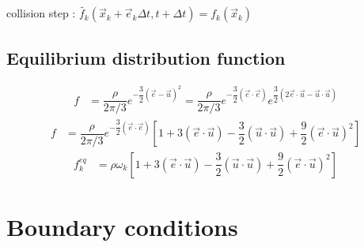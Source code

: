 \documentclass[12pt,a4paper]{report}
\begin{document}
	collision step : $\tilde{f_k}\left(\vec{x}_k + \vec{e}_k\Delta t, t+ \Delta t\right) = f_k(\vec{x}_k)$
	
	\subsection{Equilibrium distribution function}
		\begin{align}
			f &= \dfrac{\rho}{2\pi/3}e^{-\dfrac{3}{2}(\vec{e}-\vec{u})^2} = \dfrac{\rho}{2\pi/3}e^{-\dfrac{3}{2}(\vec{e}\cdot\vec{e})}e^{\dfrac{3}{2}(2\vec{e}\cdot\vec{u} - \vec{u}\cdot\vec{u})}
		\end{align}
		\begin{align}
			f &= \dfrac{\rho}{2\pi/3}e^{-\dfrac{3}{2}(\vec{e}\cdot\vec{e})}\left[1+3\left(\vec{e}\cdot\vec{u}\right) - \dfrac{3}{2}(\vec{u}\cdot\vec{u}) + \dfrac{9}{2}(\vec{e}\cdot\vec{u})^2\right]		
		\end{align}
		\begin{align}
			f^{eq}_k &= \rho\omega_k\left[1+3\left(\vec{e}\cdot\vec{u}\right) - \dfrac{3}{2}(\vec{u}\cdot\vec{u}) + \dfrac{9}{2}(\vec{e}\cdot\vec{u})^2\right]
		\end{align}
	
	\section{Boundary conditions}
	
\end{document}

